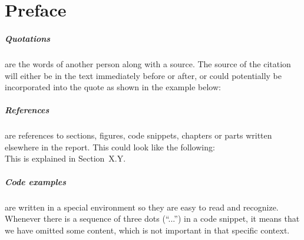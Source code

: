 \chapter*{Preface}
\label{preface}


\paragraph{Quotations} are the words of another person along with a source.
The source of the citation will either be in the text immediately before or after, or could potentially be incorporated into the quote as shown in the example below: \\


\paragraph{References} are references to sections, figures, code snippets, chapters or parts written elsewhere in the report. 
This could look like the following:\\

This is explained in Section~X.Y.

\paragraph{Code examples} are written in a special environment so they are easy to read and recognize. 
Whenever there is a sequence of three dots (``...'') in a code snippet, it means that we have omitted some content, which is not important in that specific context.

%
